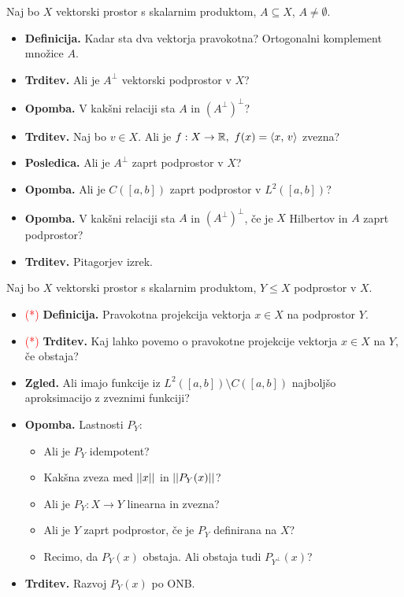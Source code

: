\begin{enumerate}
    Naj bo \(X\) vektorski prostor s skalarnim produktom, \(A \subseteq X\), \(A \neq \emptyset\).
    \begin{itemize}
        \item \textbf{Definicija.} Kadar sta dva vektorja pravokotna? Ortogonalni komplement množice \(A\).
        \item \textbf{Trditev.} Ali je \(A^\perp\) vektorski podprostor v \(X\)?
        \item \textbf{Opomba.} V kakšni relaciji sta \(A\) in \((A^\perp)^\perp\)?
        \item \textbf{Trditev.} Naj bo \(v \in X\). Ali je \(f: X \to \mathbb{R}, \ f(x) = \langle x, \, v \rangle\) zvezna?
        \item \textbf{Posledica.} Ali je \(A^\perp\) zaprt podprostor v \(X\)?
        \item \textbf{Opomba.} Ali je \(C([a, b])\) zaprt podprostor v \(L^2([a,b])\)?
        \item \textbf{Opomba.} V kakšni relaciji sta \(A\) in \((A^\perp)^\perp\), če je \(X\) Hilbertov in \(A\) zaprt podprostor?
        \item \textbf{Trditev.} Pitagorjev izrek.
    \end{itemize}
    \newpage
    Naj bo \(X\) vektorski prostor s skalarnim produktom, \(Y \leq X\) podprostor v \(X\).
    \begin{itemize}
        \item \textcolor{red}{(*)} \textbf{Definicija.} Pravokotna projekcija vektorja \(x \in X\) na podprostor \(Y\).
        \item \textcolor{red}{(*)} \textbf{Trditev.} Kaj lahko povemo o pravokotne projekcije vektorja \(x \in X\) na \(Y\), če obstaja?
        \item \textbf{Zgled.} Ali imajo funkcije iz \(L^2([a, b]) \setminus C([a, b])\) najboljšo aproksimacijo z zveznimi funkciji?
        \item \textbf{Opomba.} Lastnosti \(P_Y\):
        \begin{itemize}
            \item Ali je \(P_Y\) idempotent?
            \item Kakšna zveza med \(||x||\) in \(||P_Y(x)||\)?
            \item Ali je \(P_Y: X \to Y\) linearna in zvezna?
            \item Ali je \(Y\) zaprt podprostor, če je \(P_Y\) definirana na \(X\)?
            \item Recimo, da \(P_Y(x)\) obstaja. Ali obstaja tudi \(P_{Y^\perp}(x)\)?
        \end{itemize}
        \item \textbf{Trditev.} Razvoj \(P_Y(x)\) po ONB.
    \end{itemize}


\end{enumerate}
